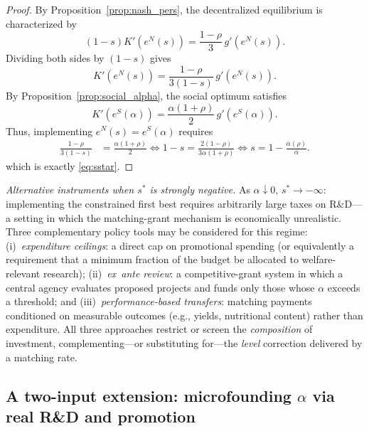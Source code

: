 \begin{proof}
By Proposition~\ref{prop:nash_pers}, the decentralized equilibrium is characterized by
\begin{equation*}
(1-s)K'\!\left(e^{N}(s)\right)=\frac{1-\rho}{3}\,g'\!\left(e^{N}(s)\right).
\end{equation*}
Dividing both sides by $(1-s)$ gives
\begin{equation*}
K'\!\left(e^{N}(s)\right)=\frac{1-\rho}{3(1-s)}\,g'\!\left(e^{N}(s)\right).
\end{equation*}
By Proposition~\ref{prop:social_alpha}, the social optimum satisfies
\begin{equation*}
K'\!\left(e^{S}(\alpha)\right)=\frac{\alpha(1+\rho)}{2}\,g'\!\left(e^{S}(\alpha)\right).
\end{equation*}
Thus, implementing $e^{N}(s)=e^{S}(\alpha)$ requires
\begin{equation*}
\begin{aligned}
\frac{1-\rho}{3(1-s)}&=\frac{\alpha(1+\rho)}{2}
\iff
1-s=\frac{2(1-\rho)}{3\alpha(1+\rho)}
\iff
s=1-\frac{\bar\alpha(\rho)}{\alpha}.
\end{aligned}
\end{equation*}
which is exactly \eqref{eq:sstar}.
\end{proof}

\noindent\textit{Alternative instruments when $s^{*}$ is strongly negative.}
As $\alpha\downarrow 0$, $s^{*}\to -\infty$: implementing the constrained first best requires arbitrarily large taxes on R\&D---a setting in which the matching-grant mechanism is economically unrealistic. Three complementary policy tools may be considered for this regime:
(i)~\emph{expenditure ceilings}: a direct cap on promotional spending (or equivalently a requirement that a minimum fraction of the budget be allocated to welfare-relevant research);
(ii)~\emph{ex~ante review}: a competitive-grant system in which a central agency evaluates proposed projects and funds only those whose $\alpha$ exceeds a threshold; and
(iii)~\emph{performance-based transfers}: matching payments conditioned on measurable outcomes (e.g., yields, nutritional content) rather than expenditure.
All three approaches restrict or screen the \emph{composition} of investment, complementing---or substituting for---the \emph{level} correction delivered by a matching rate.

\subsection{A two-input extension: microfounding \texorpdfstring{$\alpha$}{alpha} via real R\&D and promotion}
\label{subsec:microfound_alpha}

